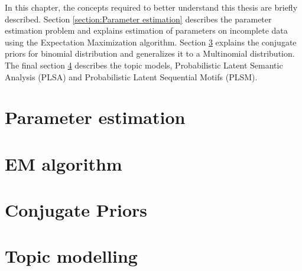 In this chapter, the concepts required to better understand this thesis are briefly described. Section \ref{section:Parameter estimation} describes the parameter estimation problem and explains estimation of parameters on incomplete data using the Expectation Maximization algorithm. Section \ref{section:conjugate priors} explains the conjugate priors for binomial distribution and generalizes it to a Multinomial distribution. The final section \ref{section:topic modelling} describes the topic models, Probabilistic Latent Semantic Analysis (PLSA) and Probabilistic Latent Sequential Motifs (PLSM).
\section{Parameter estimation} 

\section{EM algorithm}

\section{Conjugate Priors} 

\label{section:conjugate priors}
\section{Topic modelling}
\label{section:topic modelling}


